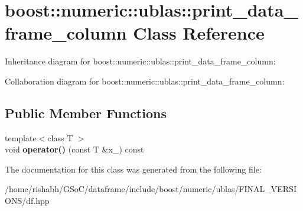 \hypertarget{classboost_1_1numeric_1_1ublas_1_1print__data__frame__column}{}\section{boost\+:\+:numeric\+:\+:ublas\+:\+:print\+\_\+data\+\_\+frame\+\_\+column Class Reference}
\label{classboost_1_1numeric_1_1ublas_1_1print__data__frame__column}


Inheritance diagram for boost\+:\+:numeric\+:\+:ublas\+:\+:print\+\_\+data\+\_\+frame\+\_\+column\+:


Collaboration diagram for boost\+:\+:numeric\+:\+:ublas\+:\+:print\+\_\+data\+\_\+frame\+\_\+column\+:
\subsection*{Public Member Functions}
\begin{DoxyCompactItemize}
\item 
{\footnotesize template$<$class T $>$ }\\void {\bfseries operator()} (const T \&x\+\_\+) const \hypertarget{classboost_1_1numeric_1_1ublas_1_1print__data__frame__column_a91dca557aff7b9592af415b28d6722f0}{}\label{classboost_1_1numeric_1_1ublas_1_1print__data__frame__column_a91dca557aff7b9592af415b28d6722f0}

\end{DoxyCompactItemize}


The documentation for this class was generated from the following file\+:\begin{DoxyCompactItemize}
\item 
/home/rishabh/\+G\+So\+C/dataframe/include/boost/numeric/ublas/\+F\+I\+N\+A\+L\+\_\+\+V\+E\+R\+S\+I\+O\+N\+S/df.\+hpp\end{DoxyCompactItemize}
